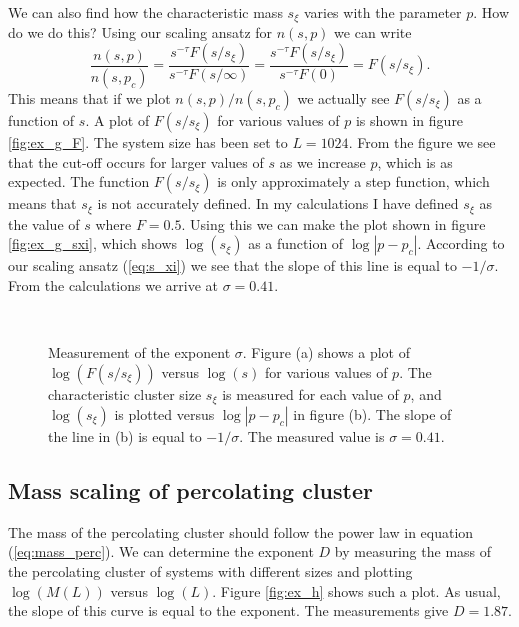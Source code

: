 \documentclass[12pt]{article}
\newcommand{\bdi}{\begin{displaymath}}
\newcommand{\edi}{\end{displaymath}}
\begin{document}
We can also find how the characteristic mass $s_\xi$ varies with the parameter $p$. How do we do this? Using our scaling ansatz for $n(s,p)$ we can write
\bdi
\frac{n(s,p)}{n(s,p_c)} = \frac{s^{-\tau}F(s/s_\xi)}{s^{-\tau}F(s/\infty)} = \frac{s^{-\tau}F(s/s_\xi)}{s^{-\tau}F(0)} = F(s/s_\xi).
\edi
This means that if we plot $n(s,p)/n(s,p_c)$ we actually see $F(s/s_\xi)$ as a function of $s$. A plot of $F(s/s_\xi)$ for various values of $p$ is shown in figure \ref{fig:ex_g_F}.
The system size has been set to $L = 1024$. From the figure we see that the cut-off occurs for larger values of $s$ as we increase $p$, which is as expected. The function $F(s/s_\xi)$ is only
approximately a step function, which means that $s_\xi$ is not accurately defined. In my calculations I have defined $s_\xi$ as the value of $s$ where $F = 0.5$. Using this we can make the plot shown in
figure \ref{fig:ex_g_sxi}, which shows $\log(s_\xi)$ as a function of $\log|p-p_c|$. According to our scaling ansatz (\ref{eq:s_xi}) we see that the slope of this line is equal to $-1/\sigma$.
From the calculations we arrive at $\sigma = 0.41$.


\begin{figure}[!ht]
    \begin{center}
        \hspace{5mm}
        \\ 
    \end{center}
    \caption{Measurement of the exponent $\sigma$. Figure (a) shows a plot of $\log(F(s/s_\xi)) $ versus $\log(s)$ for various values of $p$. The characteristic cluster size $s_\xi$ is measured
             for each value of $p$, and $\log(s_\xi)$ is plotted versus $\log|p-p_c|$ in figure (b). The slope of the line in (b) is equal to $-1/\sigma$. The measured value is $\sigma = 0.41$.}
    \label{fig:ex_g}
\end{figure}






\subsection*{Mass scaling of percolating cluster}
The mass of the percolating cluster should follow the power law in equation (\ref{eq:mass_perc}). We can determine the exponent $D$ by measuring the mass of the percolating cluster of systems with different
sizes and plotting $\log(M(L))$ versus $\log(L)$. Figure \ref{fig:ex_h} shows such a plot. As usual, the slope of this curve is equal to the exponent. The measurements give $D = 1.87$.
\end{document}
